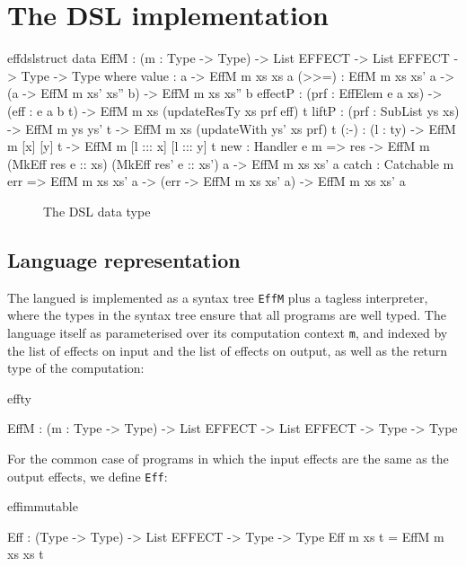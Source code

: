 \section{The \Eff{} DSL implementation}

\begin{SaveVerbatim}{effdslstruct}
data EffM : (m : Type -> Type) -> List EFFECT -> List EFFECT -> Type -> Type where
     value   : a -> EffM m xs xs a
     (>>=)   : EffM m xs xs' a -> (a -> EffM m xs' xs'' b) -> EffM m xs xs'' b
     effectP : (prf : EffElem e a xs) -> (eff : e a b t) -> EffM m xs (updateResTy xs prf eff) t
     liftP   : (prf : SubList ys xs) -> EffM m ys ys' t -> EffM m xs (updateWith ys' xs prf) t
     (:-)    : (l : ty) -> EffM m [x] [y] t -> EffM m [l ::: x] [l ::: y] t
     new     : Handler e m => res -> EffM m (MkEff res e :: xs) (MkEff res' e :: xs') a -> EffM m xs xs' a
     catch   : Catchable m err => EffM m xs xs' a -> (err -> EffM m xs xs' a) -> EffM m xs xs' a
\end{SaveVerbatim}

\begin{figure*}[t]
\begin{center}
\end{center}
\caption{The \Eff{} DSL data type}
\label{effdsltype}
\end{figure*}

\subsection{Language representation}

The \Eff{} langued is implemented as a syntax tree \texttt{EffM}
plus a tagless interpreter, where the
types in the syntax tree ensure that all \Eff{} programs are well typed.
The language itself as parameterised over its computation context \texttt{m},
and indexed by the list of effects on input and the list of effects on output,
as well as the return type of the computation:

\begin{SaveVerbatim}{effty}

EffM : (m : Type -> Type) -> 
       List EFFECT -> List EFFECT -> Type -> Type

\end{SaveVerbatim}

\noindent
For the common case of programs in which the input effects are the same as
the output effects, we define \texttt{Eff}:

\begin{SaveVerbatim}{effimmutable}

Eff : (Type -> Type) -> List EFFECT -> Type -> Type
Eff m xs t = EffM m xs xs t

\end{SaveVerbatim}

